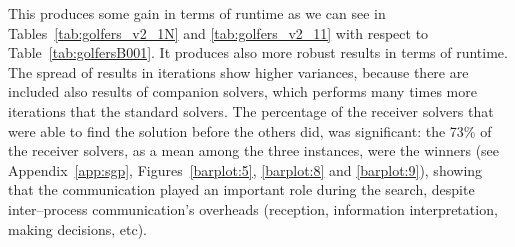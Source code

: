 This \commstr{} produces some gain in terms of runtime as we can see in Tables~\ref{tab:golfers_v2_1N} and \ref{tab:golfers_v2_11} with respect to Table~\ref{tab:golfersB001}. It produces also more robust results in terms of runtime. The spread of results in iterations show higher variances, because there are included also results of companion solvers, which performs many times more iterations that the standard solvers. The percentage of the receiver solvers that were able to find the solution before the others did, was significant: the 73\% of the receiver solvers, as a mean among the three instances, were the winners (see Appendix~\ref{app:sgp}, Figures~\ref{barplot:5}, \ref{barplot:8} and \ref{barplot:9}), showing that the communication played an important role during the search, despite inter--process communication's overheads (reception, information interpretation, making decisions, etc).

\begin{table}
\captionsetup{belowskip=6pt,aboveskip=6pt}
\centering 
\renewcommand{\arraystretch}{1}
\caption{Companion \commstr{} with communication \oneTn}
\label{tab:golfers_v2_1N}
\end{table}

